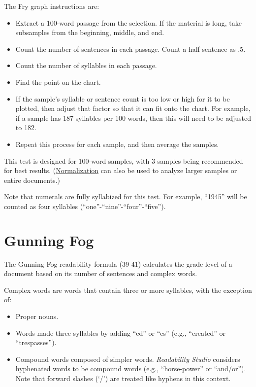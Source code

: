 \documentclass[
]{book}
\providecommand{\tightlist}{%
  \setlength{\itemsep}{0pt}\setlength{\parskip}{0pt}}
\theoremstyle{definition}
\theoremstyle{definition}
\theoremstyle{definition}
\theoremstyle{definition}
\theoremstyle{remark}
\begin{document}
\begin{minipage}{\textwidth}

The Fry graph instructions are:

\begin{itemize}
\tightlist
\item
  Extract a 100-word passage from the selection. If the material is long, take subsamples from the beginning, middle, and end.
\item
  Count the number of sentences in each passage. Count a half sentence as .5.
\item
  Count the number of syllables in each passage.
\item
  Find the point on the chart.
\item
  If the sample's syllable or sentence count is too low or high for it to be plotted, then adjust that factor so that it can fit onto the chart. For example, if a sample has 187 syllables per 100 words, then this will need to be adjusted to 182.
\item
  Repeat this process for each sample, and then average the samples.
\end{itemize}

\end{minipage}

This test is designed for 100-word samples, with 3 samples being recommended for best results. (\protect\hyperlink{glossary}{Normalization} can also be used to analyze larger samples or entire documents.)

Note that numerals are fully syllabized for this test. For example, ``1945'' will be counted as four syllables (``one''-``nine''-``four''-``five'').

\newpage

\hypertarget{gunning-fog-test}{%
\section{\texorpdfstring{Gunning Fog}{Gunning Fog}}\label{gunning-fog-test}}

The Gunning Fog readability formula (39-41) calculates the grade level of a document based on its number of sentences and complex words.

Complex words are words that contain three or more syllables, with the exception of:

\begin{itemize}
\tightlist
\item
  Proper nouns.
\item
  Words made three syllables by adding ``ed'' or ``es'' (e.g., ``created'' or ``trespasses'').
\item
  Compound words composed of simpler words. \emph{Readability Studio} considers hyphenated words to be compound words (e.g., ``horse-power'' or ``and/or''). Note that forward slashes (`/') are treated like hyphens in this context.
\end{itemize}
\end{document}
